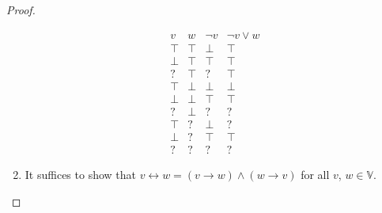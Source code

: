 \documentclass[12pt]{article}
\theoremstyle{definition}
\newcommand{\bottom}{\mathord{\perp}}
\begin{document}
\begin{proof}
\begin{enumerate}
\[
\begin{array}{ll|l|l}
v     & w     & \neg v & \neg v \vee w\\\hline
\top  & \top  & \bottom  & \top\\
\bottom & \top  & \top   & \top\\
?     & \top  & ?      & \top\\
\top  & \bottom & \bottom  & \bottom\\
\bottom & \bottom & \top   & \top\\
?     & \bottom & ?      & ?\\
\top  & ?     & \bottom  & ?\\
\bottom & ?     & \top   & \top\\
?     & ?     & ?      & ?
\end{array}
\]
\item
It suffices to show that $v \leftrightarrow w = (v \rightarrow w) \wedge (w \rightarrow v)$ for all $v$, $w \in \mathbb{V}$.


\end{enumerate}
\end{proof}
\end{document}
